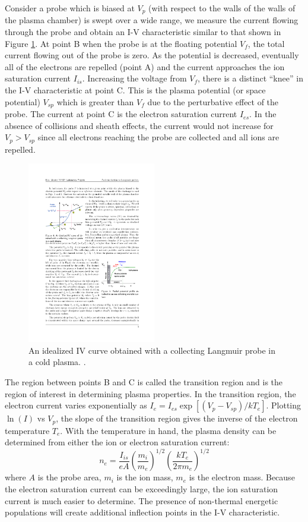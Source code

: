 \documentclass{jpp}
\begin{document}
Consider a probe which is biased at $V_p$ (with respect to the walls of the walls of the plasma chamber) is swept over a wide range, we measure the current flowing through the probe and obtain an I-V characteristic similar to that shown in Figure \ref{fig:langmuir}. At point B when the probe is at the floating potential $V_f$, the total current flowing out of the probe is zero. As the potential is decreased, eventually all of the electrons are repelled (point A) and the current approaches the ion saturation current $I_{is}$. Increasing the voltage from $V_f$, there is a distinct ``knee'' in the I-V characteristic at point C. This is the plasma potential (or space potential) $V_{sp}$ which is greater than $V_f$ due to the perturbative effect of the probe. The current at point C is the electron saturation current $I_{es}$. In the absence of collisions and sheath effects, the current would not increase for $V_p > V_{sp}$ since all electrons reaching the probe are collected and all ions are repelled.
\begin{figure}
  \centering
  \includegraphics[width=0.5\textwidth]{langmuir-iv-curve.pdf}
  \caption{An idealized IV curve obtained with a collecting Langmuir probe in a cold plasma. \citep{Conde2011AnIT}.}
\label{fig:langmuir}
\end{figure}
The region between points B and C is called the transition region and is the region of interest in determining plasma properties. In the transition region, the electron current varies exponentially as $I_e = I_{es} \exp [(V_p - V_{sp})/ k T_e]$. Plotting $\ln(I)$ vs $V_p$, the slope of the transition region gives the inverse of the electron temperature $T_e$. With the temperature in hand, the plasma density can be determined from either the ion or electron saturation current:
\begin{equation*}
n_e = \frac{I_{is}}{e A} \left( \frac{m_i}{m_e} \right)^{1/2} \left( \frac{k T_e}{2 \pi m_e} \right) ^{1/2}
\end{equation*}
where $A$ is the probe area, $m_i$ is the ion mass, $m_e$ is the electron mass. Because the electron saturation current can be exceedingly large, the ion saturation current is much easier to determine. The presence of non-thermal energetic populations will create additional inflection points in the I-V characteristic.
\end{document}
